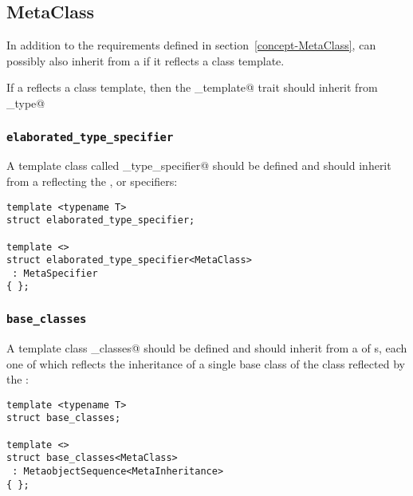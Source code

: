 \subsection{MetaClass}

In addition to the requirements defined in section~\ref{concept-MetaClass},
 can possibly also inherit from 
a  if it reflects a class template. 

If a  reflects a class template, then the \verb@is_template@
trait should inherit from \verb@true_type@

\subsubsection{\texttt{elaborated\_type\_specifier}}

A template class called \verb@elaborated_type_specifier@ should be defined and should inherit from
a  reflecting the \verb@class@, \verb@struct@ or \verb@union@
specifiers:

\begin{verbatim}
template <typename T>
struct elaborated_type_specifier;

template <>
struct elaborated_type_specifier<MetaClass>
 : MetaSpecifier
{ };
\end{verbatim}

\subsubsection{\texttt{base\_classes}}

A template class \verb@base_classes@ should be defined and should inherit from
a  of s, each one of which reflects the inheritance
of a single base class of the class reflected by the :

\begin{verbatim}
template <typename T>
struct base_classes;

template <>
struct base_classes<MetaClass>
 : MetaobjectSequence<MetaInheritance>
{ };
\end{verbatim}

